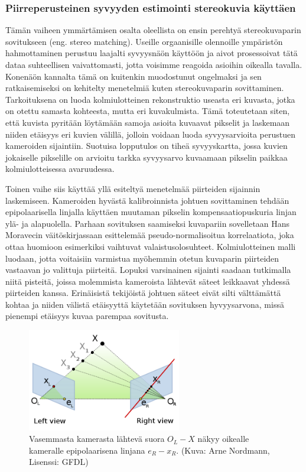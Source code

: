 \documentclass[finnish]{tktltiki2}
\theoremstyle{definition}
\theoremstyle{remark}
\begin{document}
\subsubsection{Piirreperusteinen syvyyden estimointi stereokuvia käyttäen}
Tämän vaiheen ymmärtämisen osalta oleellista on ensin perehtyä stereokuvaparin sovitukseen (eng. stereo matching). Useille orgaanisille olennoille ympäristön hahmottaminen perustuu laajalti syvyysnäön käyttöön ja aivot prosessoivat tätä dataa suhteellisen vaivattomasti, jotta voisimme reagoida asioihin oikealla tavalla. Konenäön kannalta tämä on kuitenkin muodostunut ongelmaksi ja sen ratkaisemiseksi on kehitelty menetelmiä kuten stereokuvaparin sovittaminen. Tarkoituksena on luoda kolmiulotteinen rekonstruktio useasta eri kuvasta, jotka on otettu samasta kohteesta, mutta eri kuvakulmista. Tämä toteutetaan siten, että kuvista pyritään löytämään samoja asioita kuvaavat pikselit ja laskemaan niiden etäisyys eri kuvien välillä, jolloin voidaan luoda syvyysarvioita perustuen kameroiden sijaintiin. Suotuisa lopputulos on tiheä syvyyskartta, jossa kuvien jokaiselle pikselille on arvioitu tarkka syvyysarvo kuvaamaan pikselin paikkaa kolmiulotteisessa avaruudessa.\cite{hong2010study}

Toinen vaihe siis käyttää yllä esiteltyä menetelmää piirteiden sijainnin laskemiseen. Kameroiden hyvästä kalibroinnista johtuen sovittaminen tehdään epipolaarisella linjalla käyttäen muutaman pikselin kompensaatiopuskuria linjan ylä- ja alapuolella. Parhaan sovituksen saamiseksi kuvapariin sovelletaan Hans Moravecin väitöskirjassaan esittelemää pseudo-normalisoitua korrelaatiota, joka ottaa huomioon esimerkiksi vaihtuvat valaistusolosuhteet\cite{moravec1980obstacle}. Kolmiulotteinen malli luodaan, jotta voitaisiin varmistua myöhemmin otetun kuvaparin piirteiden vastaavan jo valittuja piirteitä. Lopuksi varsinainen sijainti saadaan tutkimalla niitä pisteitä, joissa molemmista kameroista lähtevät säteet leikkaavat yhdessä piirteiden kanssa. Erinäisistä tekijöistä johtuen säteet eivät silti välttämättä kohtaa ja niiden välistä etäisyyttä käytetään sovituksen hyvyysarvona, missä pienempi etäisyys kuvaa parempaa sovitusta.\cite{cheng2005visual}

\begin{figure}[H]
	\centering
		\includegraphics[width=0.6\textwidth]{epipolar_geometry}
	\caption{Vasemmasta kamerasta lähtevä suora $O_L-X$ näkyy oikealle kameralle epipolaarisena linjana $e_R-x_R$. (Kuva: Arne Nordmann, Lisenssi: GFDL)}
\end{figure}
\end{document}
